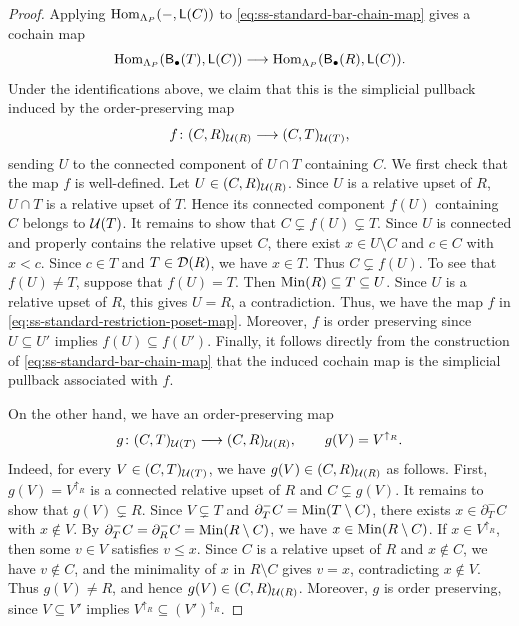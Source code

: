 \begin{proof}
Applying $\operatorname{Hom}_{\Lambda_P}(-,\mathsf L(C))$ to
\eqref{eq:ss-standard-bar-chain-map} gives a cochain map
\[
\operatorname{Hom}_{\Lambda_P}(\mathsf B_\bullet(T),\mathsf L(C))
\longrightarrow
\operatorname{Hom}_{\Lambda_P}(\mathsf B_\bullet(R),\mathsf L(C)).
\]
Under the identifications above, we claim that this is the simplicial pullback
induced by the order-preserving map
\begin{equation}
\label{eq:ss-standard-restriction-poset-map}
f\colon
(C,R)_{\mathcal U(R)}
\longrightarrow
(C,T)_{\mathcal U(T)},
\end{equation}
sending $U$ to the connected component of $U\cap T$ containing $C$.
We first check that the map $f$ is well-defined. 
Let $U\in(C,R)_{\mathcal U(R)}$.  Since $U$ is a relative upset of $R$, $U\cap T$ is a relative upset of $T$.  Hence its connected component
$f(U)$ containing $C$ belongs to $\mathcal U(T)$. 
It remains to show that
$C\subsetneq f(U)\subsetneq T$.
Since $U$ is connected and properly contains the relative upset $C$,
there exist $x\in U\setminus C$ and $c\in C$ with $x<c$.
Since $c\in T$ and $T\in\mathcal D(R)$, we have $x\in T$.
Thus $C\subsetneq f(U)$.
To see that $f(U)\neq T$, suppose that $f(U)=T$.
Then $\operatorname{Min}(R)\subseteq T\subseteq U$.
Since $U$ is a relative upset of $R$, this gives $U=R$, a
contradiction. Thus, we have the map $f$ in \eqref{eq:ss-standard-restriction-poset-map}.
Moreover, $f$ is order preserving since $U\subseteq U'$ implies $f(U)\subseteq f(U')$.
Finally, it follows directly from the construction of
\eqref{eq:ss-standard-bar-chain-map} that the induced cochain map is the simplicial pullback associated with $f$.


On the other hand, we have an order-preserving map 
\begin{equation}
\label{eq:ss-standard-restriction-poset-inverse}
g\colon
(C,T)_{\mathcal U(T)}
\longrightarrow
(C,R)_{\mathcal U(R)},
\qquad
g(V)=V^{\uparrow_R}.
\end{equation}
Indeed, for every $V\in(C,T)_{\mathcal U(T)}$, we have
$g(V)\in(C,R)_{\mathcal U(R)}$ as follows.
First, $g(V)=V^{\uparrow_R}$ is a connected relative upset of $R$ and
$C\subsetneq g(V)$.
It remains to show that $g(V)\subsetneq R$.
Since $V\subsetneq T$ and
$\partial_T^-C=\operatorname{Min}(T\setminus C)$, there exists
$x\in\partial_T^-C$ with $x\notin V$.
By
$\partial_T^-C=\partial_R^-C=\operatorname{Min}(R\setminus C)$,
we have $x\in\operatorname{Min}(R\setminus C)$.
If $x\in V^{\uparrow_R}$, then some $v\in V$ satisfies $v\leq x$.
Since $C$ is a relative upset of $R$ and $x\notin C$, we have
$v\notin C$, and the minimality of $x$ in $R\setminus C$ gives
$v=x$, contradicting $x\notin V$.
Thus $g(V)\neq R$, and hence
$g(V)\in(C,R)_{\mathcal U(R)}$.
Moreover, $g$ is order preserving, since
$V\subseteq V'$ implies
$V^{\uparrow_R}\subseteq (V')^{\uparrow_R}$.




\end{proof}
